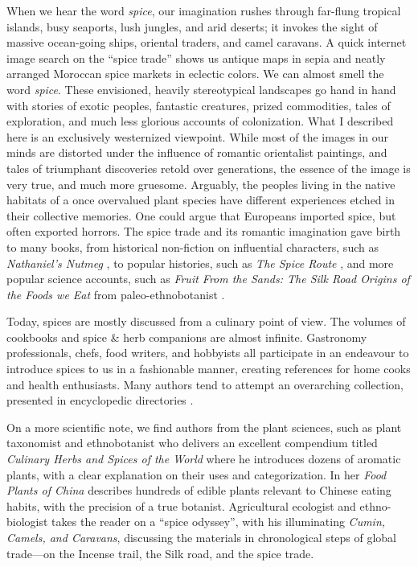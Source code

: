 When we hear the word \textit{spice}, our imagination rushes through far-flung tropical islands, busy seaports, lush jungles, and arid deserts; it invokes the sight of massive ocean-going ships, oriental traders, and camel caravans. A quick internet image search on the ``spice trade'' shows us antique maps in sepia and neatly arranged Moroccan spice markets in eclectic colors. We can almost smell the word \textit{spice}. These envisioned, heavily stereotypical landscapes go hand in hand with stories of exotic peoples, fantastic creatures, prized commodities, tales of exploration, and much less glorious accounts of colonization. What I described here is an exclusively westernized viewpoint. While most of the images in our minds are distorted under the influence of romantic orientalist paintings, and tales of triumphant discoveries retold over generations, the essence of the image is very true, and much more gruesome. Arguably, the peoples living in the native habitats of a once overvalued plant species have different experiences etched in their collective memories. One could argue that Europeans imported spice, but often exported horrors. The spice trade and its romantic imagination gave birth to many books, from historical non-fiction on influential characters, such as \textit{Nathaniel's Nutmeg} \autocite{milton_nathaniels_1999}, to popular histories, such as \textit{The Spice Route} \autocite{keay_spice_2006}, and more popular science accounts, such as \textit{Fruit From the Sands: The Silk Road Origins of the Foods we Eat} from paleo-ethnobotanist \textcite{spengler_fruit_2019}. 

Today, spices are mostly discussed from a culinary point of view. The volumes of cookbooks and spice \& herb companions are almost infinite. Gastronomy professionals, chefs, food writers, and hobbyists all participate in an endeavour to introduce spices to us in a fashionable manner, creating references for home cooks and health enthusiasts. Many authors tend to attempt an overarching collection, presented in encyclopedic directories \autocite{farrell_spices_1985,craze_spice_1997,herman_herb_2015,norman_herbs_2015,lakshmi_encyclopedia_2016,oconnell_book_2016,opara_culinary_2021}. 

On a more scientific note, we find authors from the plant sciences, such as plant taxonomist and ethnobotanist \textcite{van_wyk_culinary_2014} who delivers an excellent compendium titled \textit{Culinary Herbs and Spices of the World} where he introduces dozens of aromatic plants, with a clear explanation on their uses and categorization. In her \textit{Food Plants of China} \textcite{hu_food_2005} describes hundreds of edible plants relevant to Chinese eating habits, with the precision of a true botanist. Agricultural ecologist and ethno-biologist \textcite{nabhan_cumin_2014} takes the reader on a ``spice odyssey'', with his illuminating \textit{Cumin, Camels, and Caravans}, discussing the materials in chronological steps of global trade---on the Incense trail, the Silk road, and the spice trade.

